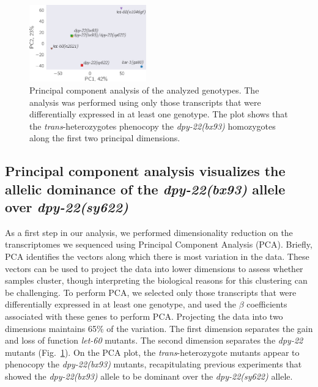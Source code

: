 \documentclass[9pt,twocolumn,twoside]{gsajnl}
\newcommand{\gene}[1]{\mbox{\emph{#1}}}
\newcommand{\dpy}[1]{\gene{dpy-22#1}}
\newcommand{\bx}{\dpy{(bx93)}}
\newcommand{\sy}{\dpy{(sy622)}}
\begin{document}
\begin{figure}
  \centering{}
  \includegraphics[width=0.45\textwidth]{../figs/pca.pdf}
  \caption{
           Principal component analysis of the analyzed genotypes. The
           analysis was performed using only those transcripts that were
           differentially expressed in at least one genotype. The plot shows
           that the \emph{trans}-heterozygotes phenocopy the \bx{} homozygotes
           along the first two principal dimensions.
           }
\label{fig:pca}
\end{figure}

\subsection*{Principal component analysis visualizes the allelic dominance of
             the \bx{} allele over \sy{}}
As a first step in our analysis, we performed dimensionality reduction on the
transcriptomes we sequenced using Principal Component Analysis (PCA). Briefly,
PCA identifies the vectors along which there is most variation in the data.
These vectors can be used to project the data into lower dimensions to assess
whether samples cluster, though interpreting the biological reasons for this
clustering can be challenging. To perform PCA, we selected only those
transcripts that were differentially expressed in at least one genotype, and
used the $\beta$ coefficients associated with these genes to perform PCA.\@
Projecting the data into two dimensions maintains 65\% of the variation. The
first dimension separates the gain and loss of function \gene{let-60} mutants.
The second dimension separates the \dpy{} mutants (Fig.~\ref{fig:pca}). On the
PCA plot, the \emph{trans}-heterozygote mutants appear to phenocopy the \bx{}
mutants, recapitulating previous experiments that showed the \bx{} allele to be
dominant over the \sy{} allele.
\end{document}
